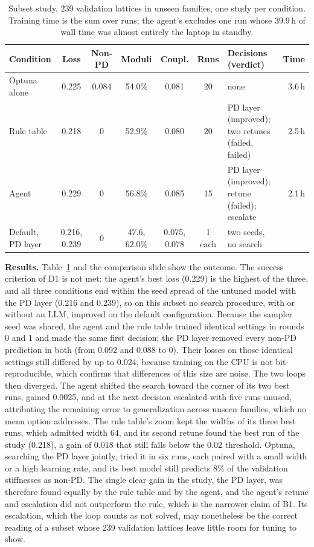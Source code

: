 \documentclass[11pt]{article}
\begin{document}
\begin{table}[!htb]\centering\small
\caption{Subset study, 239 validation lattices in unseen families, one study per condition.
Training time is the sum over runs; the agent's excludes one run whose 39.9\,h of wall time was
almost entirely the laptop in standby.}\label{tab:study}
\begin{tabularx}{\linewidth}{@{}lccccc>{\raggedright\arraybackslash}Xr@{}}\toprule
Condition & Loss & Non-PD & Moduli & Coupl. & Runs & Decisions (verdict) & Time\\\midrule
Optuna alone & 0.225 & 0.084 & 54.0\% & 0.081 & 20 & none & 3.6\,h\\
Rule table & 0.218 & 0 & 52.9\% & 0.080 & 20 & PD layer (improved); two retunes (failed, failed) & 2.5\,h\\
Agent & 0.229 & 0 & 56.8\% & 0.085 & 15 & PD layer (improved); retune (failed); escalate & 2.1\,h\\
Default, PD layer & 0.216, 0.239 & 0 & 47.6, 62.0\% & 0.075, 0.078 & 1 each & two seeds, no search & \\\bottomrule
\end{tabularx}
\end{table}
\textbf{Results.} Table~\ref{tab:study} and the comparison slide show the outcome. The success
criterion of D1 is not met: the agent's best loss (0.229) is the highest of the three, and all
three conditions end within the seed spread of the untuned model with the PD layer (0.216 and
0.239), so on this subset no search procedure, with or without an LLM, improved on the default
configuration. Because the sampler seed was shared, the agent and the rule table trained identical
settings in rounds 0 and 1 and made the same first decision; the PD layer removed every non-PD
prediction in both (from 0.092 and 0.088 to 0). Their losses on those identical settings still
differed by up to 0.024, because training on the CPU is not bit-reproducible, which confirms that
differences of this size are noise. The two loops then diverged. The agent shifted the search
toward the corner of its two best runs, gained 0.0025, and at the next decision escalated with
five runs unused, attributing the remaining error to generalization across unseen families, which
no menu option addresses. The rule table's zoom kept the widths of its three best runs, which
admitted width 64, and its second retune found the best run of the study (0.218), a gain of 0.018
that still falls below the 0.02 threshold. Optuna, searching the PD layer jointly, tried it in
six runs, each paired with a small width or a high learning rate, and its best model still
predicts 8\% of the validation stiffnesses as non-PD. The single clear gain in the study, the PD
layer, was therefore found equally by the rule table and by the agent, and the agent's retune and
escalation did not outperform the rule, which is the narrower claim of B1. Its escalation, which
the loop counts as not solved, may nonetheless be the correct reading of a subset whose 239
validation lattices leave little room for tuning to show.
\end{document}
